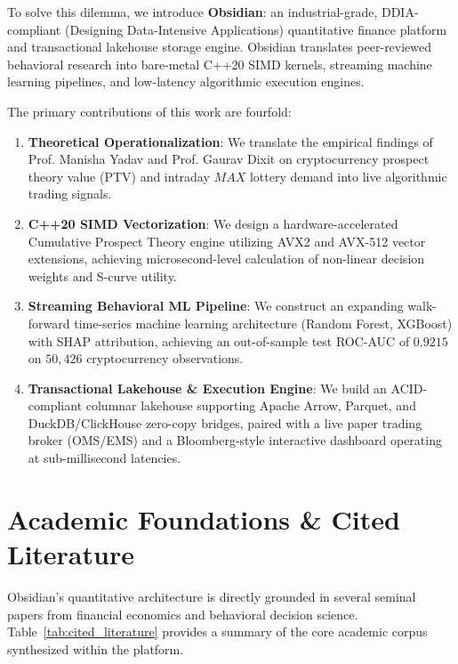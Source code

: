 \documentclass[10pt,journal,compsoc]{IEEEtran}
\begin{document}
To solve this dilemma, we introduce \textbf{Obsidian}: an industrial-grade, DDIA-compliant (Designing Data-Intensive Applications) quantitative finance platform and transactional lakehouse storage engine. Obsidian translates peer-reviewed behavioral research into bare-metal C++20 SIMD kernels, streaming machine learning pipelines, and low-latency algorithmic execution engines.

The primary contributions of this work are fourfold:
\begin{enumerate}
    \item \textbf{Theoretical Operationalization}: We translate the empirical findings of Prof. Manisha Yadav and Prof. Gaurav Dixit on cryptocurrency prospect theory value (PTV) and intraday $MAX$ lottery demand into live algorithmic trading signals.
    \item \textbf{C++20 SIMD Vectorization}: We design a hardware-accelerated Cumulative Prospect Theory engine utilizing AVX2 and AVX-512 vector extensions, achieving microsecond-level calculation of non-linear decision weights and S-curve utility.
    \item \textbf{Streaming Behavioral ML Pipeline}: We construct an expanding walk-forward time-series machine learning architecture (Random Forest, XGBoost) with SHAP attribution, achieving an out-of-sample test ROC-AUC of $0.9215$ on $50,426$ cryptocurrency observations.
    \item \textbf{Transactional Lakehouse \& Execution Engine}: We build an ACID-compliant columnar lakehouse supporting Apache Arrow, Parquet, and DuckDB/ClickHouse zero-copy bridges, paired with a live paper trading broker (OMS/EMS) and a Bloomberg-style interactive dashboard operating at sub-millisecond latencies.
\end{enumerate}

\section{Academic Foundations \& Cited Literature}

Obsidian's quantitative architecture is directly grounded in several seminal papers from financial economics and behavioral decision science. Table~\ref{tab:cited_literature} provides a summary of the core academic corpus synthesized within the platform.
\end{document}
